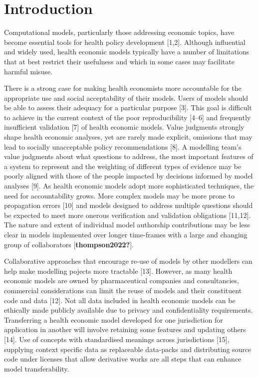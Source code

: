 \documentclass[
]{article}
\begin{document}
\hypertarget{introduction}{%
\section{Introduction}\label{introduction}}

Computational models, particularly those addressing economic topics, have become essential tools for health policy development {[}1,2{]}. Although influential and widely used, health economic models typically have a number of limitations that at best restrict their usefulness and which in some cases may facilitate harmful misuse.

There is a strong case for making health economists more accountable for the appropriate use and social acceptability of their models. Users of models should be able to assess their adequacy for a particular purpose {[}3{]}. This goal is difficult to achieve in the current context of the poor reproducibility {[}4--6{]} and frequently insufficient validation {[}7{]} of health economic models. Value judgments strongly shape health economic analyses, yet are rarely made explicit, omissions that may lead to socially unacceptable policy recommendations {[}8{]}. A modelling team's value judgments about what questions to address, the most important features of a system to represent and the weighting of different types of evidence may be poorly aligned with those of the people impacted by decisions informed by model analyses {[}9{]}. As health economic models adopt more sophisticated techniques, the need for accountability grows. More complex models may be more prone to propagation errors {[}10{]} and models designed to address multiple questions should be expected to meet more onerous verification and validation obligations {[}11,12{]}. The nature and extent of individual model authorship contributions may be less clear in models implemented over longer time-frames with a large and changing group of collaborators {[}\textbf{thompson2022?}{]}.

Collaborative approaches that encourage re-use of models by other modellers can help make modelling pojects more tractable {[}13{]}. However, as many health economic models are owned by pharmaceutical companies and consultancies, commercial considerations can limit the reuse of models and their constituent code and data {[}12{]}. Not all data included in health economic models can be ethically made publicly available due to privacy and confidentiality requirements. Transferring a health economic model developed for one jurisdiction for application in another will involve retaining some features and updating others {[}14{]}. Use of concepts with standardised meanings across jurisdictions {[}15{]}, supplying context specific data as replaceable data-packs and distributing source code under licenses that allow derivative works are all steps that can enhance model transferability.
\end{document}
